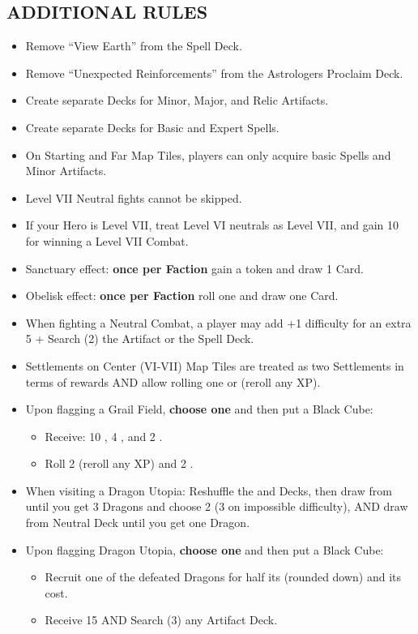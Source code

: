 \begin{multicols*}{2}
\subsection*{\MakeUppercase{Additional Rules}}
\begin{itemize}
  \item Remove ``View Earth'' from the Spell Deck.
  \item Remove ``Unexpected Reinforcements'' from the Astrologers Proclaim Deck.
  \item Create separate Decks for Minor, Major, and Relic Artifacts.
  \item Create separate Decks for Basic and Expert Spells.
  \item On Starting and Far Map Tiles, players can only acquire basic Spells and Minor Artifacts.
  \item Level VII Neutral fights cannot be skipped.
  \item If your Hero is Level VII, treat Level VI neutrals as Level VII, and gain 10  for winning a Level VII Combat.
  \item Sanctuary effect: \textbf{once per Faction} gain a  token and draw 1 Card.
  \item Obelisk effect: \textbf{once per Faction} roll one  and draw one Card.
  \item When fighting a Neutral Combat, a player may add +1 difficulty for an extra 5  + Search (2) the Artifact or the Spell Deck.
  \item Settlements on Center (VI-VII) Map Tiles are treated as two Settlements in terms of rewards AND allow rolling one  or  (reroll any XP).
  \item Upon flagging a Grail Field, \textbf{choose one} and then put a Black Cube: %
  \begin{itemize}
    \item Receive: 10 , 4 , and 2 .
    \item Roll 2  (reroll any XP) and 2 .
  \end{itemize}
  \item When visiting a Dragon Utopia: Reshuffle the  and  Decks, then draw from  until you get 3 Dragons and choose 2 (3 on impossible difficulty), AND draw from  Neutral Deck until you get one Dragon.
  \item Upon flagging Dragon Utopia, \textbf{choose one} and then put a Black Cube: 
  \begin{itemize}
    \item Recruit one of the defeated Dragons for half its  (rounded down) and its  cost.
    \item Receive 15  AND Search (3) any Artifact Deck.
  \end{itemize}
\end{itemize}


\end{multicols*}
